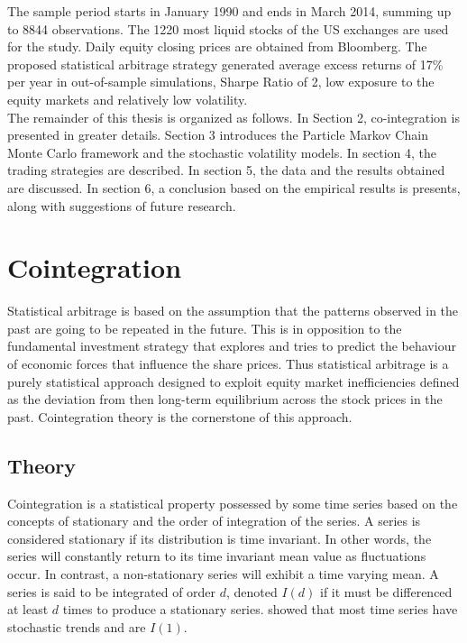 \documentclass[11pt,a4,twosided,singlespacing,titlepagenumber=on]{scrreprt}
\numberwithin{equation}{chapter} %
\theoremstyle{remark}
\begin{document}
The sample period starts in January 1990 and ends in March 2014, summing up to 8844 observations. The 1220 most liquid stocks of the US exchanges are used for the study. Daily equity closing prices are obtained from Bloomberg. The proposed statistical arbitrage strategy generated average excess returns of 17\% per year in out-of-sample simulations, Sharpe Ratio of 2, low exposure to the equity markets and relatively low volatility. \\


The remainder of this thesis is organized as follows. In Section 2, co-integration is presented in greater details. Section 3 introduces the Particle Markov Chain Monte Carlo framework and the stochastic volatility models. In section 4, the trading strategies are described. In section 5, the data and the results obtained are discussed. In section 6, a conclusion based on the empirical results is presents, along with suggestions of future research.

\chapter{Cointegration}

Statistical arbitrage is based on the assumption that the patterns observed in the past are going to be repeated in the future. This is in opposition to the fundamental investment strategy that explores and tries to predict the behaviour of economic forces that influence the share prices. Thus statistical arbitrage is a purely statistical approach designed to exploit equity market inefficiencies defined as the deviation from then long-term equilibrium across the stock prices in the past. Cointegration theory is the cornerstone of this approach. 

\section{Theory}
Cointegration is a statistical property possessed by some time series based on the concepts of stationary and the order of integration of the series. A series is considered stationary if its distribution is time invariant. In other words, the series will constantly return to its time invariant mean value as fluctuations occur. In contrast, a non-stationary series will exhibit a time varying mean. A series is said to be integrated of order $d$, denoted $I(d)$ if it must be differenced at least $d$ times to produce a stationary series.
\cite{nelson1982} showed that most time series have stochastic trends and are $I(1)$. \\
\end{document}
